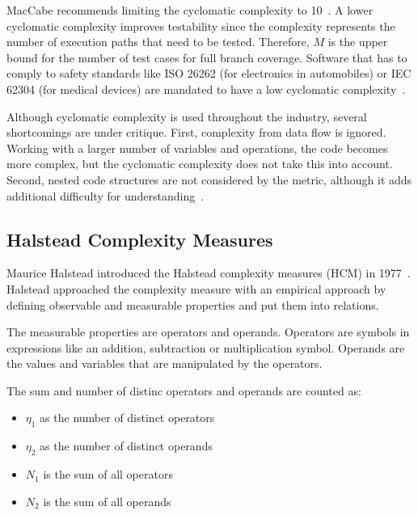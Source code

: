 MacCabe recommends limiting the cyclomatic complexity to 10~\cite{mccabe_complexity_1976}. A lower cyclomatic complexity improves testability since the complexity represents the number of execution paths that need to be tested. Therefore, $M$ is the upper bound for the number of test cases for full branch coverage. 
Software that has to comply to safety standards like ISO 26262 (for electronics in automobiles) or IEC 62304 (for medical devices) are mandated to have a low cyclomatic complexity~\cite{isotc_22sc_32_iso_2018, isotisotc_210_iec_2006c_210}.

Although cyclomatic complexity is used throughout the industry, several shortcomings are under critique. First, complexity from data flow is ignored. Working with a larger number of variables and operations, the code becomes more complex, but the cyclomatic complexity does not take this into account. Second, nested code structures are not considered by the metric, although it adds additional difficulty for understanding~\cite{yu_survey_2010}.

\subsection{Halstead Complexity Measures}
Maurice Halstead introduced the Halstead complexity measures (HCM) in 1977~\cite{halstead1977elements}. Halstead approached the complexity measure with an empirical approach by defining observable and measurable properties and put them into relations.

The measurable properties are operators and operands. Operators are symbols in expressions like an addition, subtraction or multiplication symbol. Operands are the values and variables that are manipulated by the operators. 

The sum and number of distinc operators and operands are counted as:
\begin{itemize}
    \item $\eta_1$ as the number of distinct operators 
    \item $\eta_2$ as the number of distinct operands
    \item $N_1$ is the sum of all operators
    \item $N_2$ is the sum of all operands  
\end{itemize}

